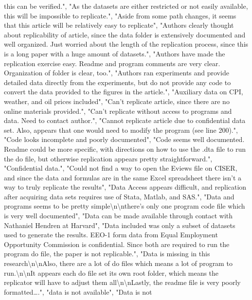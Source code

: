 \documentclass[]{article}
\begin{document}
\begin{itemize}
  this can be verified.", "As the datasets are either restricted or not
  easily available, this will be impossible to replicate.", "Aside from
  some path changes, it seems that this article will be relatively easy
  to replicate", "Authors clearly thought about replicability of
  article, since the data folder is extensively documented and well
  organized. Just worried about the length of the replication process,
  since this is a long paper with a huge amount of datasets.", "Authors
  have made the replication exercise easy. Readme and program comments
  are very clear. Organization of folder is clear, too.", "Authors ran
  experiments and provide detailed data directly from the experiments,
  but do not provide any code to convert the data provided to the
  figures in the article.", "Auxiliary data on CPI, weather, and oil
  prices included", "Can't replicate article, since there are no online
  materials provided.", "Can't replicate without access to programs and
  data. Need to contact author.", "Cannot replicate article due to
  confidential data set. Also, appears that one would need to modify the
  program (see line 200).", "Code looks incomplete and poorly
  documented", "Code seems well documented. Readme could be more
  specific, with directions on how to use the .dta file to run the do
  file, but otherwise replication appears pretty straightforward.",
  "Confidential data.", "Could not find a way to open the Eviews file on
  CISER, and since the data and formulas are in the same Excel
  spreadsheet there isn't a way to truly replicate the results", "Data
  Access appears difficult, and replication after acquiring data sets
  requires use of Stata, Matlab, and SAS.", "Data and programs seems to
  be pretty simple\textbackslash{}n\textbackslash{}nthere's only one
  program code file which is very well documented", "Data can be made
  available through contact with Nathaniel Hendren at Harvard", "Data
  included was only a subset of datasets used to generate the results.
  EEO-1 form data from Equal Employment Opportunity Commission is
  confidential. Since both are required to run the program do file, the
  paper is not replicable.", "Data is missing in this
  research\textbackslash{}n\textbackslash{}nAlso, there are a lot of do
  files which means a lot of program to
  run.\textbackslash{}n\textbackslash{}nIt appears each do file set its
  own root folder, which means the replicator will have to adjust them
  all\textbackslash{}n\textbackslash{}nLastly, the readme file is very
  poorly formatted\ldots{}.", "data is not available", "Data is not

\end{itemize}
\end{document}
